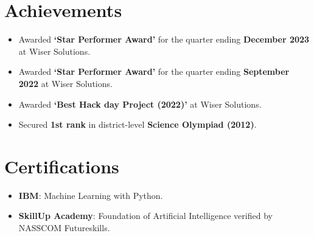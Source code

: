 \documentclass[letterpaper,11pt]{article}
\newcommand{\resumeItem}[1]{
    \item
        \small{#1}
}
\newcommand{\resumeItemListStart}{\begin{itemize}}
\newcommand{\resumeItemListEnd}{\end{itemize}}
\begin{document}
\section{Achievements}
\resumeItemListStart
    \resumeItem
    {Awarded \textbf{`Star Performer Award'} for the quarter ending \textbf{December 2023} at Wiser Solutions. \href{https://drive.google.com/file/d/11RvsYKlJ9UAnp2LHTLOc-FF-gGJzbBXb/view?usp=sharing}{\faExternalLink*}}
    \resumeItem
    {Awarded \textbf{`Star Performer Award'} for the quarter ending \textbf{September 2022} at Wiser Solutions. \href{https://drive.google.com/file/d/1SLFl3xMEQQykWYrRkAzT4aPqpjl47jUr/view?usp=share_link}{\faExternalLink*}}
    \resumeItem
    {Awarded \textbf{`Best Hack day Project (2022)'} at Wiser Solutions.}
    \resumeItem
    {Secured \textbf{1st rank} in district-level \textbf{Science Olympiad (2012)}.}
\resumeItemListEnd


\section{Certifications}
\resumeItemListStart
    \resumeItem
    {\textbf{IBM}: Machine Learning with Python. \href{https://drive.google.com/file/d/12Ia915pkCQcdrRhdlW5tJYu7HmfnpsRj/view?usp=sharing}{\faExternalLink*}}
    \resumeItem
    {\textbf{SkillUp Academy}: Foundation of Artificial Intelligence verified by NASSCOM Futureskills. \href{https://drive.google.com/file/d/1Y4Bm4yFah4c1AELEQ0Li6PR0jnRhj-1W/view?usp=sharing}{\faExternalLink*}}
\resumeItemListEnd
 
\end{document}
